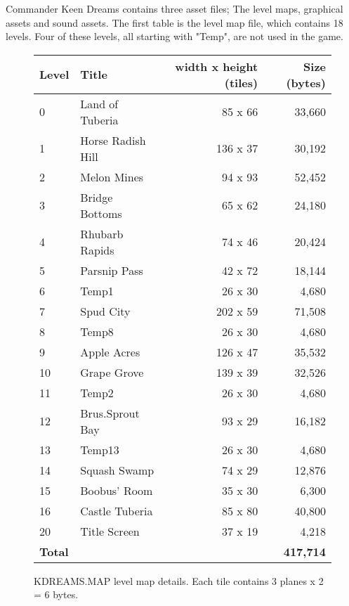 \documentclass[book.tex]{subfiles}
\begin{document}
\label{asset_details}


Commander Keen Dreams contains three asset files; The level maps, graphical assets and sound assets. The first table is the level map file, which contains 18 levels. Four of these levels, all starting with "Temp", are not used in the game.

\begin{figure}[H]
\centering
{\renewcommand{\arraystretch}{1.1} %
\begin{tabularx}{\textwidth}[c]{X X r r }
  \hline
  \textbf{Level} & \textbf{Title} & \textbf{width x height (tiles)} & \textbf{Size (bytes)}\\ \hline
	0 & Land of Tuberia & 85 x 66 &  33,660 \\
	1 & Horse Radish Hill & 136 x 37 &   30,192 \\ 
	2 & Melon Mines & 94 x 93 &   52,452 \\
	3 & Bridge Bottoms & 65 x 62 &  24,180 \\
	4 & Rhubarb Rapids & 74 x 46 &  20,424 \\
	5 & Parsnip Pass & 42 x 72 &   18,144 \\
	6 & Temp1 & 26 x 30 &   4,680 \\
	7 & Spud City & 202 x 59 &  71,508 \\
	8 & Temp8 & 26 x 30 &  4,680 \\
	9 & Apple Acres & 126 x 47 &  35,532 \\
	10 & Grape Grove & 139 x 39 &  32,526 \\
	11 & Temp2 & 26 x 30 &  4,680 \\
	12 & Brus.Sprout Bay & 93 x 29 &  16,182 \\
	13 & Temp13 & 26 x 30 &  4,680 \\
	14 & Squash Swamp & 74 x 29 &  12,876 \\
	15 & Boobus' Room & 35 x 30 &  6,300 \\
	16 & Castle Tuberia & 85 x 80 &  40,800 \\
	20 & Title Screen & 37 x 19 &  4,218 \\ \hline
	\textbf{Total} & \multicolumn{3}{r}{\textbf{417,714}} \\ \hline
\end{tabularx}
}
\caption{KDREAMS.MAP level map details. Each tile contains 3 planes x 2 = 6 bytes.}
\end{figure}
\end{document}
